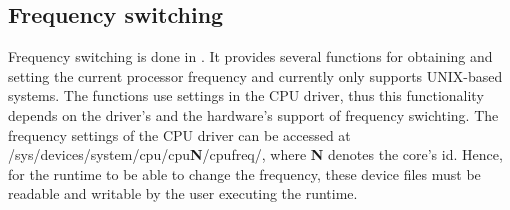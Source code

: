 \subsection{Frequency switching} 

Frequency switching is done in . It provides several functions for obtaining and setting the current processor frequency and currently only supports UNIX-based systems. The functions use settings in the CPU driver, thus this functionality depends on the driver's and the hardware's support of frequency swichting. The frequency settings of the CPU driver can be accessed at /sys/devices/system/cpu/cpu\textbf{N}/cpufreq/, where \textbf{N} denotes the core's id. Hence, for the runtime to be able to change the frequency, these device files must be readable and writable by the user executing the runtime.

